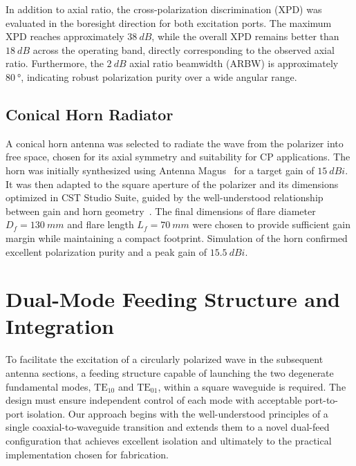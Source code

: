 \documentclass[journal,9pt]{IEEEtran}
\newcommand{\TE}[2]{\text{TE}_{#1#2}}
\begin{document}
In addition to axial ratio, the cross-polarization discrimination (XPD) was evaluated in the boresight direction for both excitation ports. The maximum XPD reaches approximately $\qty{38}{dB}$, while the overall XPD remains better than $\qty{18}{dB}$ across the operating band, directly corresponding to the observed axial ratio. Furthermore, the $\qty{2}{dB}$ axial ratio beamwidth (ARBW) is approximately $\qty{80}{\degree}$, indicating robust polarization purity over a wide angular range.


\subsection{Conical Horn Radiator}
\label{subsec:conical-horn-radiator}

A conical horn antenna was selected to radiate the wave from the polarizer into free space, chosen for its axial symmetry and suitability for CP applications. The horn was initially synthesized using Antenna Magus~\cite{antenna-magus} for a target gain of $\qty{15}{dBi}$. It was then adapted to the square aperture of the polarizer and its dimensions optimized in CST Studio Suite, guided by the well-understood relationship between gain and horn geometry~\cite{aboserwal-et-al:conical-horn-gain-and-amplitude-patterns}. The final dimensions of flare diameter $D_f = \qty{130}{mm}$ and flare length $L_f = \qty{70}{mm}$ were chosen to provide sufficient gain margin while maintaining a compact footprint. Simulation of the horn confirmed excellent polarization purity and a peak gain of $\qty{15.5}{dBi}$.


\section{Dual-Mode Feeding Structure and Integration}
\label{sec:dual-mode-feeding-structure-and-integration}

To facilitate the excitation of a circularly polarized wave in the subsequent antenna sections, a feeding structure capable of launching the two degenerate fundamental modes, $\TE 10$ and $\TE 01$, within a square waveguide is required. The design must ensure independent control of each mode with acceptable port-to-port isolation. Our approach begins with the well-understood principles of a single coaxial-to-waveguide transition and extends them to a novel dual-feed configuration that achieves excellent isolation and ultimately to the practical implementation chosen for fabrication.
\end{document}
